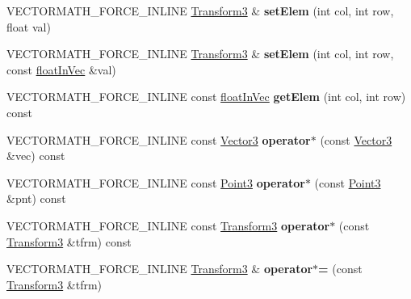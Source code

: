 \begin{DoxyCompactItemize}
\item 
\mbox{\label{classVectormath_1_1Aos_1_1Transform3_a08b89968cf498dd0363601185ca80505}} 
V\+E\+C\+T\+O\+R\+M\+A\+T\+H\+\_\+\+F\+O\+R\+C\+E\+\_\+\+I\+N\+L\+I\+NE \hyperlink{classVectormath_1_1Aos_1_1Transform3}{Transform3} \& {\bfseries set\+Elem} (int col, int row, float val)
\item 
\mbox{\label{classVectormath_1_1Aos_1_1Transform3_a970f26b4512cc718d3f9a7ffd66e3929}} 
V\+E\+C\+T\+O\+R\+M\+A\+T\+H\+\_\+\+F\+O\+R\+C\+E\+\_\+\+I\+N\+L\+I\+NE \hyperlink{classVectormath_1_1Aos_1_1Transform3}{Transform3} \& {\bfseries set\+Elem} (int col, int row, const \hyperlink{classVectormath_1_1floatInVec}{float\+In\+Vec} \&val)
\item 
\mbox{\label{classVectormath_1_1Aos_1_1Transform3_a09cc59ae0a35f2c6656acb5560a28705}} 
V\+E\+C\+T\+O\+R\+M\+A\+T\+H\+\_\+\+F\+O\+R\+C\+E\+\_\+\+I\+N\+L\+I\+NE const \hyperlink{classVectormath_1_1floatInVec}{float\+In\+Vec} {\bfseries get\+Elem} (int col, int row) const
\item 
\mbox{\label{classVectormath_1_1Aos_1_1Transform3_a970195e443ed8f6b6ed3ea50fdabdc73}} 
V\+E\+C\+T\+O\+R\+M\+A\+T\+H\+\_\+\+F\+O\+R\+C\+E\+\_\+\+I\+N\+L\+I\+NE const \hyperlink{classVectormath_1_1Aos_1_1Vector3}{Vector3} {\bfseries operator$\ast$} (const \hyperlink{classVectormath_1_1Aos_1_1Vector3}{Vector3} \&vec) const
\item 
\mbox{\label{classVectormath_1_1Aos_1_1Transform3_a0cc8681aa52dbdf42d9cf06fc6bf1ecf}} 
V\+E\+C\+T\+O\+R\+M\+A\+T\+H\+\_\+\+F\+O\+R\+C\+E\+\_\+\+I\+N\+L\+I\+NE const \hyperlink{classVectormath_1_1Aos_1_1Point3}{Point3} {\bfseries operator$\ast$} (const \hyperlink{classVectormath_1_1Aos_1_1Point3}{Point3} \&pnt) const
\item 
\mbox{\label{classVectormath_1_1Aos_1_1Transform3_a0d79485637d49309a32d1eb6b3b96998}} 
V\+E\+C\+T\+O\+R\+M\+A\+T\+H\+\_\+\+F\+O\+R\+C\+E\+\_\+\+I\+N\+L\+I\+NE const \hyperlink{classVectormath_1_1Aos_1_1Transform3}{Transform3} {\bfseries operator$\ast$} (const \hyperlink{classVectormath_1_1Aos_1_1Transform3}{Transform3} \&tfrm) const
\item 
\mbox{\label{classVectormath_1_1Aos_1_1Transform3_a300764b0cf9d1a9cb6655e92787c5190}} 
V\+E\+C\+T\+O\+R\+M\+A\+T\+H\+\_\+\+F\+O\+R\+C\+E\+\_\+\+I\+N\+L\+I\+NE \hyperlink{classVectormath_1_1Aos_1_1Transform3}{Transform3} \& {\bfseries operator$\ast$=} (const \hyperlink{classVectormath_1_1Aos_1_1Transform3}{Transform3} \&tfrm)
\end{DoxyCompactItemize}
